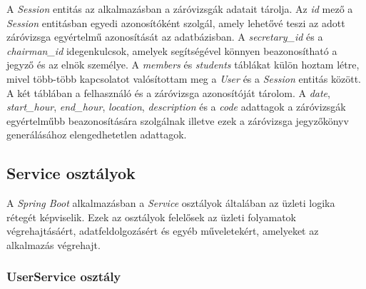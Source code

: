 A \textit{Session} entitás az alkalmazásban a záróvizsgák adatait tárolja. Az \textit{id} mező a \textit{Session} entitásban egyedi azonosítóként szolgál, amely lehetővé teszi az adott záróvizsga egyértelmű azonosítását az adatbázisban. A \textit{secretary\_id} és a \textit{chairman\_id} idegenkulcsok, amelyek segítségével könnyen beazonosítható a jegyző és az elnök személye. A \textit{members} és \textit{students} táblákat külön hoztam létre, mivel több-több kapcsolatot valósítottam meg a \textit{User} és a \textit{Session} entitás között. A két táblában a felhasználó és a záróvizsga azonosítóját tárolom. A \textit{date}, \textit{start\_hour}, \textit{end\_hour}, \textit{location}, \textit{description} és a \textit{code} adattagok a záróvizsgák egyértelműbb beazonosítására szolgálnak illetve ezek a záróvizsga jegyzőkönyv generálásához elengedhetetlen adattagok.

\subsection{Service osztályok}

A \textit{Spring Boot} \cite{spring_boot} alkalmazásban a \textit{Service} osztályok általában az üzleti logika rétegét képviselik. Ezek az osztályok felelősek az üzleti folyamatok végrehajtásáért, adatfeldolgozásért és egyéb műveletekért, amelyeket az alkalmazás végrehajt.

\subsubsection{UserService osztály}

